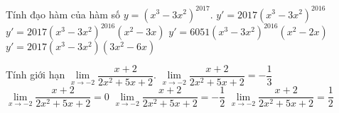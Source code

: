 \begin{ex}%
	Tính đạo hàm của hàm số $y=(x^3-3x^2)^{2017}$.
	\choice
	{$y'=2017(x^3-3x^2)^{2016}$}
	{$y'=2017(x^3-3x^2)^{2016}(x^2-3x)$}
	{\True $y'=6051(x^3-3x^2)^{2016}(x^2-2x)$}
	{$y'=2017(x^3-3x^2)(3x^2-6x)$}
\end{ex}
\begin{ex}%
	Tính giới hạn $\lim\limits_{x\to -2} \dfrac{x+2}{2x^2+5x+2}$.
	\choice
	{\True $\lim\limits_{x\to -2} \dfrac{x+2}{2x^2+5x+2}=-\dfrac{1}{3}$}
	{$\lim\limits_{x\to -2} \dfrac{x+2}{2x^2+5x+2}=0$}
	{$\lim\limits_{x\to -2} \dfrac{x+2}{2x^2+5x+2}=-\dfrac{1}{2}$}
	{$\lim\limits_{x\to -2} \dfrac{x+2}{2x^2+5x+2}=\dfrac{1}{2}$}
\end{ex}
